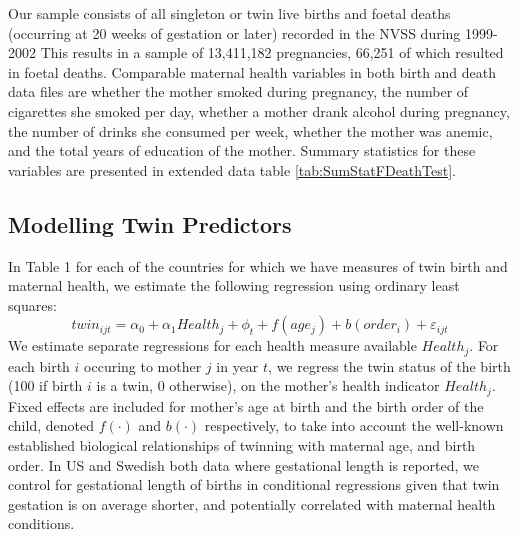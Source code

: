 \documentclass{nature}
\begin{document}
\begin{linenumbers}
Our sample consists of all singleton or twin live births and foetal deaths (occurring at 20 weeks of gestation or later) recorded in the NVSS during 1999-2002  This results in a sample of 13,411,182 pregnancies, 66,251 of which resulted in foetal deaths.  Comparable maternal health variables in both birth and death data files are whether the mother smoked during pregnancy, the number of cigarettes she smoked per day, whether a mother drank alcohol during pregnancy, the number of drinks she consumed per week, whether the mother was anemic, and the total years of education of the mother.  Summary statistics for these variables are presented in extended data table \ref{tab:SumStatFDeathTest}.

\subsection{Modelling Twin Predictors}


In Table 1 for each of the countries for which we have measures of twin birth and maternal health, we estimate the following regression using ordinary least squares:
\begin{equation}
  twin_{ijt}=\alpha_0 + \alpha_1 Health_j + \phi_t + f(age_j) + b(order_i) + \varepsilon_{ijt}
\end{equation}
We estimate separate regressions for each health measure available $Health_j$. For each birth $i$ occuring to mother $j$ in year $t$, we regress the twin status of the birth (100 if birth $i$ is a twin, 0 otherwise), on the mother's health indicator $Health_j$. Fixed effects are included for mother's age at birth and the birth order of the child, denoted $f(\cdot)$ and $b(\cdot)$ respectively, to take into account the well-known established biological relationships of twinning with maternal age, and birth order. In US and Swedish both data where gestational length is reported, we control for gestational length of births in conditional regressions given that twin gestation is on average shorter, and potentially correlated with maternal health conditions\cite{Morrison2005}.  


\end{linenumbers}
\end{document}
